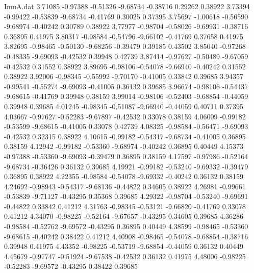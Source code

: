 \begin{filecontents}{ImuA.dat}
   3.71085   -0.97388   -0.51326   -9.68734   -0.38716    0.29262    0.38922
   3.73394   -0.99422   -0.53839   -9.68734   -0.41769    0.30025    0.37395
   3.75697   -1.00618   -0.56590   -9.68974   -0.40242    0.30789    0.38922
   3.77977   -0.98704   -0.58026   -9.69931   -0.38716    0.36895    0.41975
   3.80317   -0.98584   -0.54796   -9.66102   -0.41769    0.37658    0.41975
   3.82695   -0.98465   -0.50130   -9.68256   -0.39479    0.39185    0.43502
   3.85040   -0.97268   -0.48335   -9.69093   -0.42532    0.39948    0.42739
   3.87414   -0.97627   -0.50489   -9.67059   -0.42532    0.31552    0.38922
   3.89695   -0.98106   -0.54078   -9.66940   -0.40242    0.31552    0.38922
   3.92006   -0.98345   -0.55992   -9.70170   -0.41005    0.33842    0.39685
   3.94357   -0.99541   -0.55274   -9.69093   -0.41005    0.36132    0.39685
   3.96674   -0.98106   -0.54437   -9.68615   -0.41769    0.39948    0.38159
   3.99014   -0.98106   -0.52403   -9.68854   -0.44059    0.39948    0.39685
   4.01245   -0.98345   -0.51087   -9.66940   -0.44059    0.40711    0.37395
   4.03667   -0.97627   -0.52283   -9.67897   -0.42532    0.33078    0.38159
   4.06009   -0.99182   -0.53599   -9.68615   -0.41005    0.33078    0.42739
   4.08325   -0.98584   -0.56471   -9.69093   -0.42532    0.32315    0.38922
   4.10615   -0.99182   -0.54317   -9.68734   -0.41005    0.36895    0.38159
   4.12942   -0.99182   -0.53360   -9.68974   -0.40242    0.36895    0.40449
   4.15373   -0.97388   -0.53360   -9.69093   -0.39479    0.36895    0.38159
   4.17597   -0.97986   -0.52164   -9.68734   -0.36426    0.36132    0.39685
   4.19921   -0.99182   -0.53240   -9.69332   -0.39479    0.36895    0.38922
   4.22355   -0.98584   -0.54078   -9.69332   -0.40242    0.36132    0.38159
   4.24692   -0.98943   -0.54317   -9.68136   -0.44822    0.34605    0.38922
   4.26981   -0.99661   -0.53839   -9.71127   -0.43295    0.35368    0.39685
   4.29322   -0.98704   -0.53240   -9.69691   -0.44822    0.33842    0.41212
   4.31763   -0.98345   -0.53121   -9.66820   -0.41769    0.33078    0.41212
   4.34070   -0.98225   -0.52164   -9.67657   -0.43295    0.34605    0.39685
   4.36286   -0.98584   -0.52762   -9.69572   -0.43295    0.36895    0.40449
   4.38599   -0.98465   -0.53360   -9.68615   -0.40242    0.38422    0.41212
   4.40908   -0.98465   -0.54078   -9.68854   -0.38716    0.39948    0.41975
   4.43352   -0.98225   -0.53719   -9.68854   -0.44059    0.36132    0.40449
   4.45679   -0.97747   -0.51924   -9.67538   -0.42532    0.36132    0.41975
   4.48006   -0.98225   -0.52283   -9.69572   -0.43295    0.38422    0.39685

\end{filecontents}
